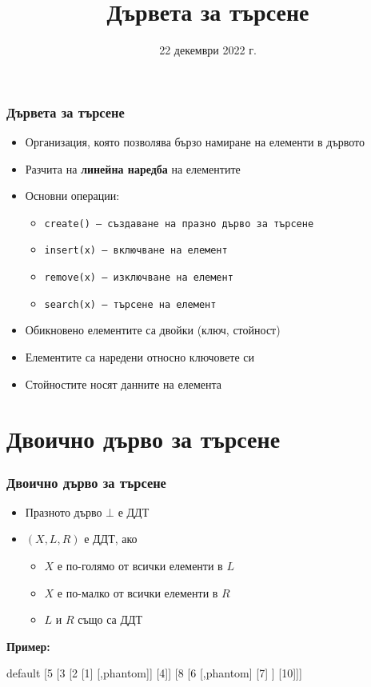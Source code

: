 \documentclass[alsotrans]{beamerswitch}
\title{Дървета за търсене}
\date{22 декември 2022 г.}
\newcommand{\samplebinordtree}{%
  \begin{forest}
    default [5 [3 [2 [1] [,phantom]] [4]] [8 [6 [,phantom] [7] ] [10]]]
  \end{forest}%
}
\begin{document}
\begin{frame}
  \titlepage
\end{frame}

\begin{frame}
  \frametitle{Дървета за търсене}
  \begin{itemize}
  \item Организация, която позволява бързо намиране на елементи в дървото
  \item Разчита на \textbf{линейна наредба} на елементите
  \item Основни операции:
    \begin{itemize}
    \item \tt{create()} --- създаване на празно дърво за търсене
    \item \tt{insert(x)} --- включване на елемент
    \item \tt{remove(x)} --- изключване на елемент
    \item \tt{search(x)} --- търсене на елемент
    \end{itemize}
  \item Обикновено елементите са двойки (ключ, стойност)
  \item Елементите са наредени относно ключовете си
  \item Стойностите носят данните на елемента
  \end{itemize}
\end{frame}

\section{Двоично дърво за търсене}

\begin{frame}
  \frametitle{Двоично дърво за търсене}
  \begin{definition}
    \begin{itemize}
    \item Празното дърво $\bot$ е ДДТ
    \item $(X,L,R)$ е ДДТ, ако
      \begin{itemize}
      \item $X$ е по-голямо от всички елементи в $L$
      \item $X$ е по-малко от всички елементи в $R$
      \item $L$ и $R$ също са ДДТ
      \end{itemize}
    \end{itemize}
  \end{definition}
  \pause
  \textbf{Пример:}
  \vspace{-2.5ex}
  \begin{center}
    \footnotesize
    \samplebinordtree
  \end{center}
\end{frame}
\end{document}
